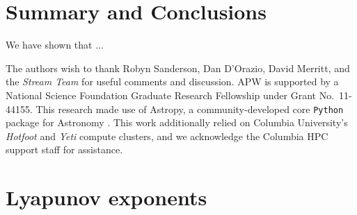 \documentclass[letterpaper,12pt,preprint]{aastex}
\newcommand{\ident}{\mathbb{1}}
\begin{document}
\section{Summary and Conclusions}\label{sec:conclusions}

We have shown that ...

\acknowledgements
The authors wish to thank Robyn Sanderson, Dan D'Orazio, David Merritt, and the \emph{Stream Team} for useful comments and discussion.
APW is supported by a National Science Foundation Graduate Research Fellowship under Grant No.\ 11-44155. 
This research made use of Astropy, a community-developed core \texttt{Python} package for Astronomy \citep{astropy13}.
This work additionally relied on Columbia University's \emph{Hotfoot} and \emph{Yeti} compute clusters, and we acknowledge the Columbia HPC support staff for assistance.




\appendix
\section{Lyapunov exponents} \label{sec:lyapapdx}

\end{document}
